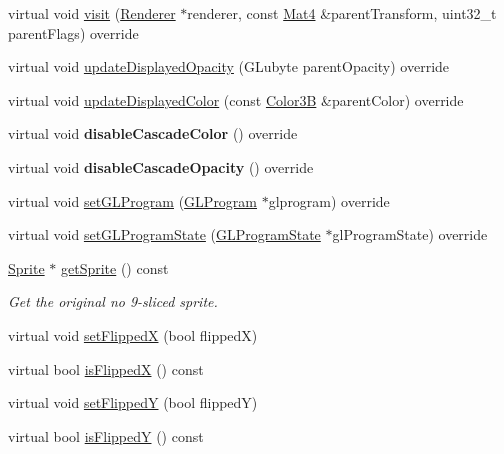 \begin{DoxyCompactItemize}
\item 
virtual void \hyperlink{classui_1_1Scale9Sprite_ad939fbf33d73420369e251a990b01bc2}{visit} (\hyperlink{classRenderer}{Renderer} $\ast$renderer, const \hyperlink{classMat4}{Mat4} \&parent\+Transform, uint32\+\_\+t parent\+Flags) override
\item 
virtual void \hyperlink{classui_1_1Scale9Sprite_a85bca0738c6bff049fe0a962d285bda4}{update\+Displayed\+Opacity} (G\+Lubyte parent\+Opacity) override
\item 
virtual void \hyperlink{classui_1_1Scale9Sprite_a130c78092b506d4b06fec469e80c554c}{update\+Displayed\+Color} (const \hyperlink{structColor3B}{Color3B} \&parent\+Color) override
\item 
\mbox{\label{classui_1_1Scale9Sprite_a03541edf14ae5dffc97d0b62d898e263}} 
virtual void {\bfseries disable\+Cascade\+Color} () override
\item 
\mbox{\label{classui_1_1Scale9Sprite_a796300de3d0a796a812a2d9ee474eb7d}} 
virtual void {\bfseries disable\+Cascade\+Opacity} () override
\item 
virtual void \hyperlink{classui_1_1Scale9Sprite_add60f59da603e007e2d4794d667f40bb}{set\+G\+L\+Program} (\hyperlink{classGLProgram}{G\+L\+Program} $\ast$glprogram) override
\item 
virtual void \hyperlink{classui_1_1Scale9Sprite_ac5d1aa898d17b1417f8d6ac5589d0440}{set\+G\+L\+Program\+State} (\hyperlink{classGLProgramState}{G\+L\+Program\+State} $\ast$gl\+Program\+State) override
\item 
\hyperlink{classSprite}{Sprite} $\ast$ \hyperlink{classui_1_1Scale9Sprite_aabbca98d76b47125df8f3aab740b91b4}{get\+Sprite} () const
\begin{DoxyCompactList}\small\item\em Get the original no 9-\/sliced sprite. \end{DoxyCompactList}\item 
virtual void \hyperlink{classui_1_1Scale9Sprite_a54fac90f2430df7598c90fa46c05b39c}{set\+FlippedX} (bool flippedX)
\item 
virtual bool \hyperlink{classui_1_1Scale9Sprite_a0bdf293c9ca00b65d25797602b4d1f58}{is\+FlippedX} () const
\item 
virtual void \hyperlink{classui_1_1Scale9Sprite_a7e6cb973788a7147d7bf69d1668b88ec}{set\+FlippedY} (bool flippedY)
\item 
virtual bool \hyperlink{classui_1_1Scale9Sprite_a06327e04537085dd71035882807224f1}{is\+FlippedY} () const

\end{DoxyCompactItemize}
